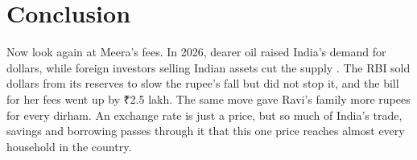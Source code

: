 \section*{Conclusion}

Now look again at Meera's fees. In 2026, dearer oil raised India's demand for dollars, while foreign investors selling Indian assets cut the supply . The RBI sold dollars from its reserves to slow the rupee's fall but did not stop it, and the bill for her fees went up by ₹2.5 lakh. The same move gave Ravi's family more rupees for every dirham. An exchange rate is just a price, but so much of India's trade, savings and borrowing passes through it that this one price reaches almost every household in the country.
